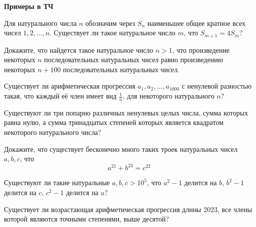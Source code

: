 \documentclass{article}
\begin{document}
    \large

    \begin{center}
        \textbf{Примеры в ТЧ}
    \end{center}


    \begin{enumerate_boxed}

        \item Для натурального числа $n$ обозначим через $S_n$ наименьшее общее кратное всех чисел $1, 2, \dotsc , n$.
        Существует ли такое натуральное число $m$, что $S_{m+1} = 4S_m$?

        \item Докажите, что найдется такое натуральное число $n > 1$, что произведение некоторых $n$ последовательных натуральных чисел равно произведению некоторых $n+100$ последовательных натуральных чисел.

        \item Существует ли арифметическая прогрессия $a_1, a_2, \dotsc, a_{1000}$ с ненулевой разностью такая, что каждый её член имеет вид $\frac{1}{n}$, для некоторого натурального $n$?

        \item Существуют ли три попарно различных ненулевых целых числа, сумма которых равна нулю, а сумма тринадцатых степеней которых является квадратом некоторого натурального числа?

        \item Докажите, что существует бесконечно много таких троек натуральных чисел $a, b, c$, что \[a^{21} + b^{23} = c^{22}\]

        \item Существуют ли такие натуральные $a, b, c > 10^5$, что $a^2 - 1$ делится на $b$, $b^2 - 1$ делится на $c$, $c^2 - 1$ делится на $a$?

        \item Существует ли возрастающая арифметическая прогрессия длины 2023, все члены которой являются точными степенями, выше десятой?


    \end{enumerate_boxed}
\end{document}
